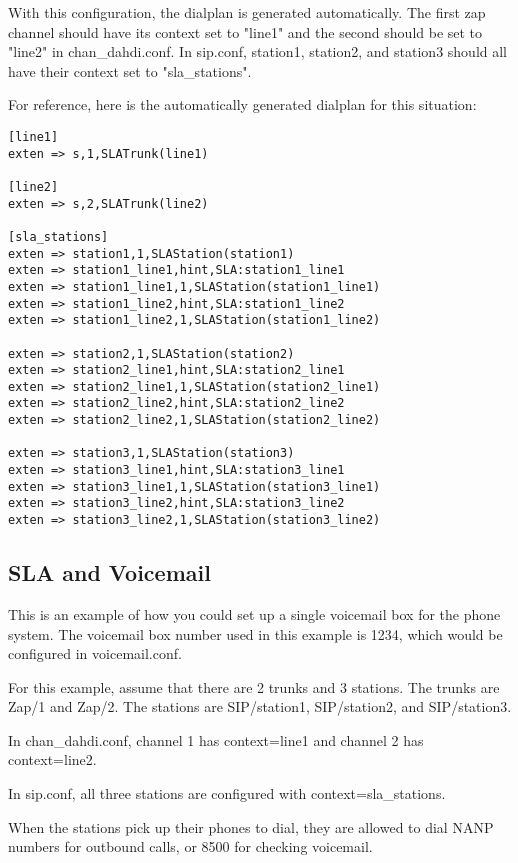 \documentclass[12pt,a4]{article}
\begin{document}
With this configuration, the dialplan is generated automatically.  The first
zap channel should have its context set to "line1" and the second should be
set to "line2" in chan_dahdi.conf.  In sip.conf, station1, station2, and station3
should all have their context set to "sla\_stations".

For reference, here is the automatically generated dialplan for this situation:
\begin{verbatim}
[line1]
exten => s,1,SLATrunk(line1)

[line2]
exten => s,2,SLATrunk(line2)

[sla_stations]
exten => station1,1,SLAStation(station1)
exten => station1_line1,hint,SLA:station1_line1
exten => station1_line1,1,SLAStation(station1_line1)
exten => station1_line2,hint,SLA:station1_line2
exten => station1_line2,1,SLAStation(station1_line2)

exten => station2,1,SLAStation(station2)
exten => station2_line1,hint,SLA:station2_line1
exten => station2_line1,1,SLAStation(station2_line1)
exten => station2_line2,hint,SLA:station2_line2
exten => station2_line2,1,SLAStation(station2_line2)

exten => station3,1,SLAStation(station3)
exten => station3_line1,hint,SLA:station3_line1
exten => station3_line1,1,SLAStation(station3_line1)
exten => station3_line2,hint,SLA:station3_line2
exten => station3_line2,1,SLAStation(station3_line2)	
\end{verbatim}


\subsection{SLA and Voicemail}
\label{voicemail}

This is an example of how you could set up a single voicemail box for the
phone system.  The voicemail box number used in this example is 1234, which
would be configured in voicemail.conf.

For this example, assume that there are 2 trunks and 3 stations.  The trunks
are Zap/1 and Zap/2.  The stations are SIP/station1, SIP/station2, and
SIP/station3.

In chan_dahdi.conf, channel 1 has context=line1 and channel 2 has context=line2.

In sip.conf, all three stations are configured with context=sla\_stations.

When the stations pick up their phones to dial, they are allowed to dial
NANP numbers for outbound calls, or 8500 for checking voicemail.
\end{document}
